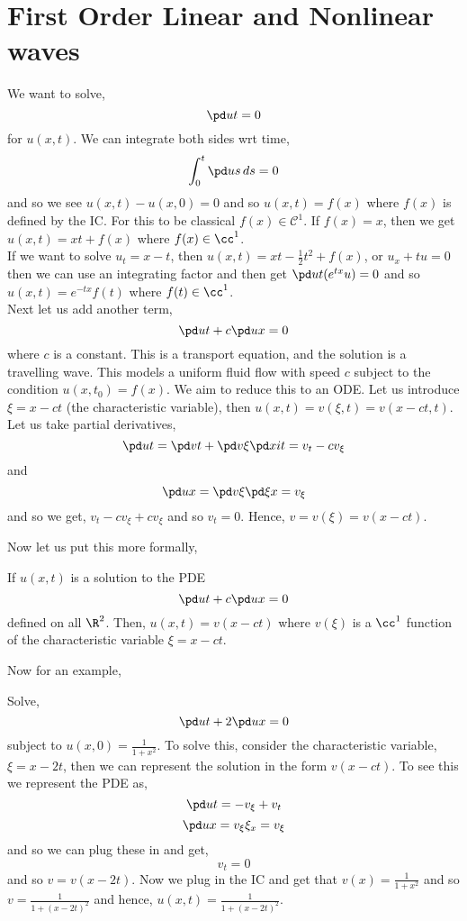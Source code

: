 \section{First Order Linear and Nonlinear waves}
We want to solve,
$$ \pd u t = 0 $$
for $u(x, t)$. We can integrate both sides wrt time,
$$ \int_0^t \pd u s \, ds = 0 $$
and so we see $u(x, t) - u(x, 0) = 0$ and so $u(x, t) = f(x)$ where $f(x)$ is defined by the IC. For this to be classical $f(x) \in \mathcal{C}^1$. If $f(x) = x$, then we get $u(x, t) = xt + f(x)$ where $f(x) \in \cc^1$.\\

If we want to solve $u_t = x - t$, then $u(x, t) = xt - \frac{1}{2}t^2 + f(x)$, or $u_x + tu = 0$ then we can use an integrating factor and then get $\pd u t (e^{tx}u) = 0$ and so $u(x, t) = e^{-tx}f(t)$ where $f(t) \in \cc^1$.\\

Next let us add another term,
$$\pd u t + c\pd u x = 0$$
where $c$ is a constant. This is a transport equation, and the solution is a travelling wave. This models a uniform fluid flow with speed $c$ subject to the condition $u(x, t_0) = f(x)$. We aim to reduce this to an ODE. Let us introduce $\xi = x - ct$ (the characteristic variable), then $u(x, t) = v(\xi, t) = v(x - ct, t)$. Let us take partial derivatives,
$$ \pd u t = \pd v t + \pd v \xi \pd xi t = v_t - cv_\xi$$
and
$$ \pd u x = \pd v \xi \pd \xi x = v_\xi $$
and so we get, $v_t - cv_\xi + cv_\xi$ and so $v_t = 0$. Hence, $v = v(\xi) = v(x - ct)$.

Now let us put this more formally,
\begin{nprop}
   If $u(x, t)$ is a solution to the PDE
   $$\pd u t + c\pd u x = 0$$
   defined on all $\R^2$. Then, $u(x, t) = v(x - ct)$ where $v(\xi)$ is a $\cc^1$ function of the characteristic variable $\xi = x - ct$.
\end{nprop}

Now for an example,
\begin{eg}
  Solve,
  $$ \pd u t + 2\pd u x = 0 $$
  subject to $u(x, 0) = \frac{1}{1 + x^2}$. To solve this, consider the characteristic variable, $\xi = x - 2t$, then we can represent the solution in the form $v(x - ct)$. To see this we represent the PDE as,
  $$ \pd u t = -v_\xi + v_t $$
  $$ \pd u x = v_\xi\xi_x = v_\xi $$
  and so we can plug these in and get,
  $$ v_t = 0 $$
  and so $v = v(x - 2t)$. Now we plug in the IC and get that $v(x) = \frac{1}{1 + x^2}$ and so $v = \frac{1}{1 + (x - 2t)^2}$ and hence, $u(x, t) = \frac{1}{1 + (x - 2t)^2}$.
\end{eg}

